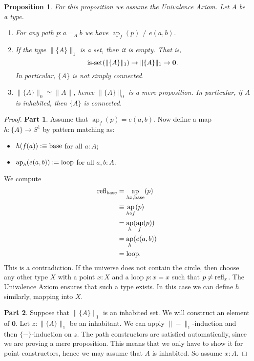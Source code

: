 \documentclass[square]{sigplanconf}
\newcommand{\empt}{\ensuremath{\mathbf{0}}}
\DeclareMathOperator{\myap}{ap}
\newcommand{\refl}{\textnormal{refl}}
\newcommand{\base}{\textnormal{base}}
\newcommand{\lp}{\textnormal{loop}}
\newcommand{\isset}{\textnormal{is-set}}
\newcommand{\ap}[2]{\ensuremath{\myap_{#1}(#2)}}
\newtheorem{proposition}[theorem]{Proposition}
\theoremstyle{definition}
\theoremstyle{remark}
\begin{document}
\begin{proposition}\label{p:notconnected}
For this proposition we assume the Univalence Axiom. Let $A$ be a type.
\begin{enumerate}
\item \label{e:1} For any path $p:a =_A b$ we have $\ap fp \neq e(a,b)$.
\item \label{e:2} If the type $\|\{A\}\|_1$ is a set, then it is empty. That is,
$$\isset(\|\{A\}\|_1) \to \|\{A\}\|_1 \to \empt.$$ In particular, $\{A\}$ is not simply connected.
\item $\|\{A\}\|_0\simeq \|A\|$, hence $\|\{A\}\|_0$ is a mere proposition. In particular, if $A$ is
  inhabited, then $\{A\}$ is connected.
\end{enumerate}
\end{proposition}
\begin{proof}
  \textbf{Part 1}. Assume that $\ap fp=e(a,b)$. Now define a map $h:\{A\}\to S^1$ by pattern
  matching as:
  \begin{itemize}
  \item $h(f(a)):\equiv \base$ for all $a:A$;
  \item $\ap h{e(a,b)}:=\lp$ for all $a,b:A$.
  \end{itemize}
  We compute
  \begin{align*}
    \refl_\base&=\ap{\lambda x, \base}p\\ &\equiv\ap{h\circ f}p\\ &=\ap h{\ap f
      p}\\ &=\ap{h}{e(a,b)}\\ &=\lp.
  \end{align*}
  This is a contradiction. If the universe does not contain the circle, then choose any other type
  $X$ with a point $x : X$ and a loop $p : x = x$ such that $p\neq \refl_x$. The Univalence Axiom
  ensures that such a type exists. In this case we can define $h$ similarly, mapping into $X$.

  \textbf{Part 2}. Suppose that $\|\{A\}\|_1$ is an inhabited set. We will construct an element of
  \empt. Let $z:\|\{A\}\|_1$ be an inhabitant. We can apply $\|{-}\|_1$-induction and then
  $\{{-}\}$-induction on $z$. The path constructors are satisfied automatically, since we are
  proving a mere proposition. This means that we only have to show it for point constructors, hence
  we may assume that $A$ is inhabited. So assume $x:A$.


\end{proof}
\end{document}
